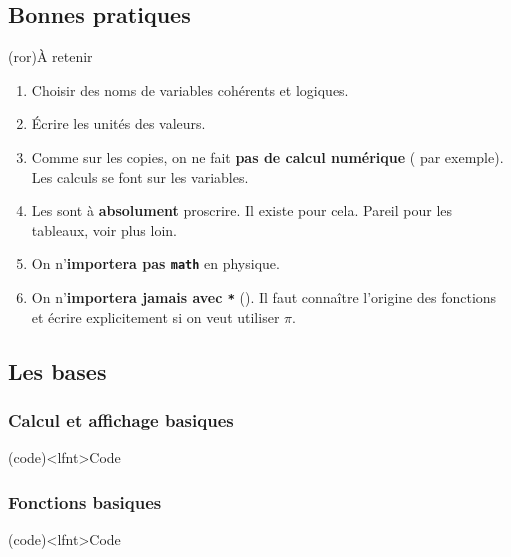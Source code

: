 \documentclass[a4paper, 12pt, garamond]{book}
\begin{document}
\subsection{Bonnes pratiques}
\begin{tcn}(ror){À retenir}
	\begin{enumerate}
		\item Choisir des noms de variables cohérents et logiques.
		\item Écrire les unités des valeurs.
		\item Comme sur les copies, on ne fait \textbf{pas de calcul numérique}
		      ( par exemple). Les calculs se font sur les
		      variables.
		\item Les  sont à \textbf{absolument} proscrire. Il existe
		       pour cela. Pareil pour les tableaux, voir plus loin.
		\item On n'\textbf{importera pas \texttt{math}} en physique.
		\item On n'\textbf{importera jamais avec \texttt{*}}
		      (). Il faut connaître l'origine des fonctions
		      et écrire explicitement  si on veut utiliser $\pi$.
	\end{enumerate}
\end{tcn}

\subsection{Les bases}
\subsubsection{Calcul et affichage basiques}
\begin{tcb}(code)<lfnt>{Code}
	\vspace{-10pt}
\end{tcb}

\vspace{-20pt}
\subsubsection{Fonctions basiques}
\begin{tcb}[breakable](code)<lfnt>{Code}
	\vspace{-10pt}
\end{tcb}
\end{document}
